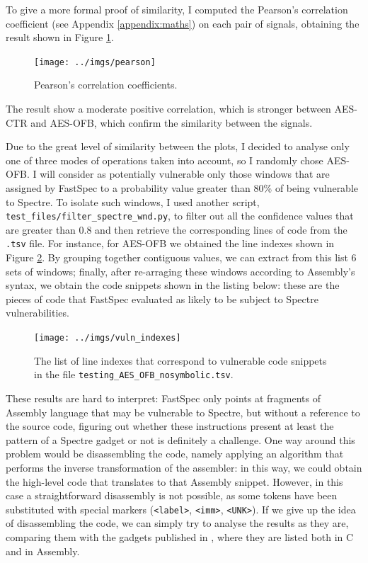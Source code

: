 \documentclass[12pt,a4paper]{book}
\theoremstyle{definition}
\begin{document}
	To give a more formal proof of similarity, I computed the Pearson's correlation coefficient (see Appendix \ref{appendix:maths}) on each pair of signals, obtaining the result shown in Figure \ref{fig:pearson}.	
	\begin{figure}[!ht]
		\centering
		\texttt{[image: ../imgs/pearson]}
		\caption{Pearson's correlation coefficients.}
		\label{fig:pearson}
	\end{figure}

	The result show a moderate positive correlation, which is stronger between AES-CTR and AES-OFB, which confirm the similarity between the signals.
	
	Due to the great level of similarity between the plots, I decided to analyse only one of three modes of operations taken into account, so I randomly chose AES-OFB. I will consider as potentially vulnerable only those windows that are assigned by FastSpec to a probability value greater than 80\% of being vulnerable to Spectre. To isolate such windows, I used another script, \texttt{test\_files/filter\_spectre\_wnd.py}, to filter out all the confidence values that are greater than 0.8 and then retrieve the corresponding lines of code from the \texttt{.tsv} file. For instance, for AES-OFB we obtained the line indexes shown in Figure \ref{fig:idx}. By grouping together contiguous values, we can extract from this list 6 sets of windows; finally, after re-arraging these windows according to Assembly's 
	syntax, we obtain the code snippets shown in the listing below: these are the pieces of code that FastSpec evaluated as likely to be subject to Spectre vulnerabilities.
	
	\begin{figure}[!ht]
		\centering
		\texttt{[image: ../imgs/vuln\_indexes]}
		\caption{The list of line indexes that correspond to vulnerable code snippets in the file \texttt{testing\_AES\_OFB\_nosymbolic.tsv}.}
		\label{fig:idx}
	\end{figure}

	These results are hard to interpret: FastSpec only points at fragments of Assembly language that may be vulnerable to Spectre, but without a reference to the source code, figuring out whether these instructions present at least the pattern of a Spectre gadget or not is definitely a challenge. One way around this problem would be disassembling the code, namely applying an algorithm that performs the inverse transformation of the assembler: in this way, we could obtain the high-level code that translates to that Assembly snippet. However, in this case a straightforward disassembly is not possible, as some tokens have been substituted with special markers (\texttt{<label>}, \texttt{<imm>}, \texttt{<UNK>}). If we give up the idea of disassembling the code, we can simply try to analyse the results as they are, comparing them with the gadgets published in \cite{Kocher2018}, where they are listed both in C and in Assembly.
	
\end{document}
